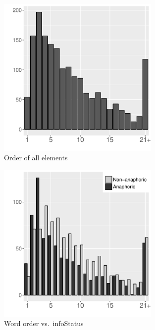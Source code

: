 \begin{figure}
	\includegraphics[width=0.7\textwidth]{figure/DEPositionAll.pdf}
	\caption{Order of all elements}
	\label{DEPositionAllF}
\end{figure}
\begin{figure}
	\includegraphics[width=0.7\textwidth]{figure/DEPositionIS.pdf}
	\caption{Word order vs.\ infoStatus}
	\label{DEPositionISF}
\end{figure}
